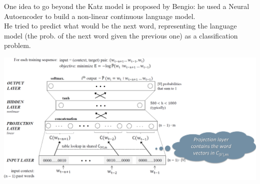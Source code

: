 One idea to go beyond the Katz model is proposed by Bengio: he used a Neural Autoencoder to build a non-linear continuous language model. \\
He tried to predict what would be the next word, representing the language model (the prob. of the next word given the previous one) as a classification problem. \\

\begin{minipage}{\linewidth}
        \centering
        \includegraphics[width=15cm, height=6.5cm]{images/an_embedding.png}
\end{minipage} \\

